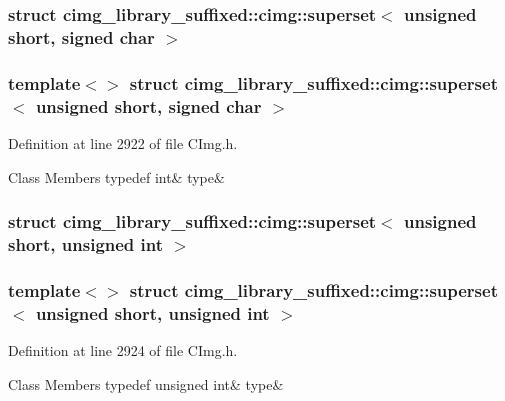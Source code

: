 \subsubsection{struct cimg\+\_\+library\+\_\+suffixed\+:\+:cimg\+:\+:superset$<$ unsigned short, signed char $>$}
\subsubsection*{template$<$$>$\newline
struct cimg\+\_\+library\+\_\+suffixed\+::cimg\+::superset$<$ unsigned short, signed char $>$}



Definition at line 2922 of file C\+Img.\+h.

\begin{DoxyFields}{Class Members}
\mbox{\label{namespacecimg__library__suffixed_1_1cimg_a7362691336de47c9fa23caeec77edb85}} 
typedef int&
type&
\\
\hline

\end{DoxyFields}
\label{structcimg__library__suffixed_1_1cimg_1_1superset_3_01unsigned_01short_00_01unsigned_01int_01_4}
\subsubsection{struct cimg\+\_\+library\+\_\+suffixed\+:\+:cimg\+:\+:superset$<$ unsigned short, unsigned int $>$}
\subsubsection*{template$<$$>$\newline
struct cimg\+\_\+library\+\_\+suffixed\+::cimg\+::superset$<$ unsigned short, unsigned int $>$}



Definition at line 2924 of file C\+Img.\+h.

\begin{DoxyFields}{Class Members}
\mbox{\label{namespacecimg__library__suffixed_1_1cimg_a4feee8ad6d9531c094accdba33262511}} 
typedef unsigned int&
type&
\\
\hline

\end{DoxyFields}


